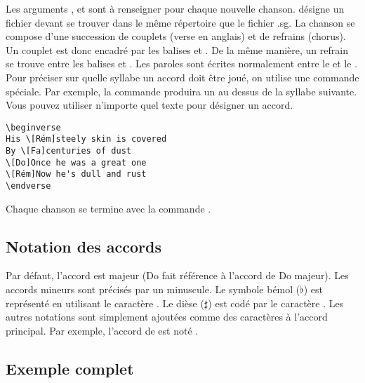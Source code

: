\documentclass[versionenligne]{patacrep}
\begin{document}
Les arguments ,  et  sont
à renseigner pour chaque nouvelle chanson.  désigne
un fichier  devant se trouver dans le même
répertoire que le fichier .sg.  La chanson se compose d'une succession
de couplets (verse en anglais) et de refrains (chorus). Un couplet est
donc encadré par les balises  et . De
la même manière, un refrain se trouve entre les balises
 et .  Les paroles sont écrites
normalement entre le  et le . Pour
préciser sur quelle syllabe un accord doit être joué, on utilise une
commande spéciale. Par exemple, la commande \latexcom{[Mi]} produira
un  au dessus de la syllabe suivante. Vous pouvez utiliser n'importe
quel texte pour désigner un accord.

\begin{center}
\begin{verbatim}
\beginverse
His \[Rém]steely skin is covered
By \[Fa]centuries of dust
\[Do]Once he was a great one
\[Rém]Now he's dull and rust
\endverse
\end{verbatim}
\end{center}

Chaque chanson se termine avec la commande .

\subsection{Notation des accords}\label{sect:about}

Par défaut, l'accord est majeur (Do fait référence à l'accord de Do
majeur). Les accords mineurs sont précisés par un  minuscule.  Le
symbole bémol ($\flat$) est représenté en utilisant le caractère \command{\&}.  Le
dièse ($\sharp$) est codé par le caractère \command{\#}. Les autres notations sont
simplement ajoutées comme des caractères à l'accord principal. Par
exemple, l'accord de  est noté \latexcom{[La\&m]}.


\subsection{Exemple complet}
\end{document}
